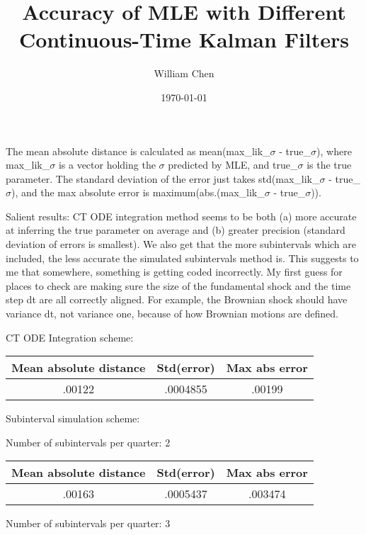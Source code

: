 \documentclass[12 pt, oneside]{article}
\title{Accuracy of MLE with Different Continuous-Time Kalman Filters}
\author{William Chen}
\date{\today}
\theoremstyle{definition}
\theoremstyle{definition}
\theoremstyle{definition}
\newcommand{\fd}{\vspace{2.5mm}}
\begin{document}
\maketitle

The mean absolute distance is calculated as mean(max\_lik\_$\sigma$ - true\_$\sigma$),
where max\_lik\_$\sigma$ is a vector holding the $\sigma$ predicted by MLE, and true\_$\sigma$ is the true parameter. The standard deviation of the error
just takes std(max\_lik\_$\sigma$ - true\_$\sigma$), and the max absolute error is
maximum(abs.(max\_lik\_$\sigma$ - true\_$\sigma$)).


\fd

Salient results: CT ODE integration method seems to be both (a) more accurate at inferring the true parameter on average and (b) greater precision (standard deviation of errors is smallest). We also get that the more subintervals which are included, the less accurate the simulated subintervals method is. This suggests to me that somewhere, something is getting coded incorrectly. My first guess for places to check are making sure the size of the fundamental shock and the time step dt are all correctly aligned. For example, the Brownian shock should have variance dt, not variance one, because of how Brownian motions are defined.

\fd

CT ODE Integration scheme:

\begin{center}
\begin{tabular}{|c|c|c|}
\hline
  Mean absolute distance & Std(error) & Max abs error\\
\hline
.00122 & .0004855 & .00199\\
\hline
\end{tabular}
\end{center}


Subinterval simulation scheme:

\fd

Number of subintervals per quarter: 2

\begin{center}
\begin{tabular}{|c|c|c|}
\hline
  Mean absolute distance & Std(error) & Max abs error\\
\hline
.00163 & .0005437 & .003474\\
\hline
\end{tabular}
\end{center}


Number of subintervals per quarter: 3
\end{document}
